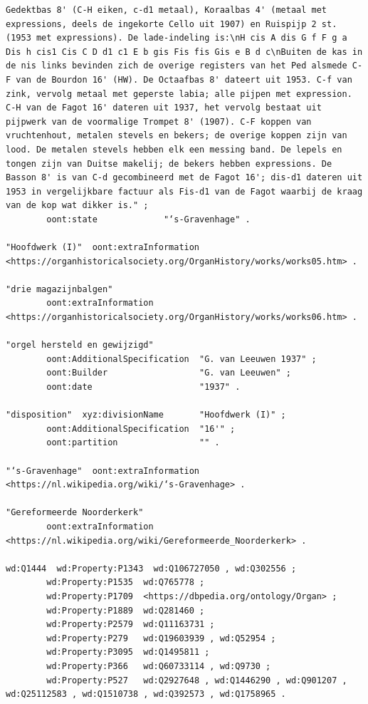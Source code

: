 \begin{lstlisting}[caption={Part14\_000GravenhageNoorderkerk}]
Gedektbas 8' (C-H eiken, c-d1 metaal), Koraalbas 4' (metaal met expressions, deels de ingekorte Cello uit 1907) en Ruispijp 2 st. (1953 met expressions). De lade-indeling is:\nH cis A dis G f F g a Dis h cis1 Cis C D d1 c1 E b gis Fis fis Gis e B d c\nBuiten de kas in de nis links bevinden zich de overige registers van het Ped alsmede C-F van de Bourdon 16' (HW). De Octaafbas 8' dateert uit 1953. C-f van zink, vervolg metaal met geperste labia; alle pijpen met expression. C-H van de Fagot 16' dateren uit 1937, het vervolg bestaat uit pijpwerk van de voormalige Trompet 8' (1907). C-F koppen van vruchtenhout, metalen stevels en bekers; de overige koppen zijn van lood. De metalen stevels hebben elk een messing band. De lepels en tongen zijn van Duitse makelij; de bekers hebben expressions. De Basson 8' is van C-d gecombineerd met de Fagot 16'; dis-d1 dateren uit 1953 in vergelijkbare factuur als Fis-d1 van de Fagot waarbij de kraag van de kop wat dikker is." ;
        oont:state             "‘s-Gravenhage" .

"Hoofdwerk (I)"  oont:extraInformation  <https://organhistoricalsociety.org/OrganHistory/works/works05.htm> .

"drie magazijnbalgen"
        oont:extraInformation  <https://organhistoricalsociety.org/OrganHistory/works/works06.htm> .

"orgel hersteld en gewijzigd"
        oont:AdditionalSpecification  "G. van Leeuwen 1937" ;
        oont:Builder                  "G. van Leeuwen" ;
        oont:date                     "1937" .

"disposition"  xyz:divisionName       "Hoofdwerk (I)" ;
        oont:AdditionalSpecification  "16'" ;
        oont:partition                "" .

"‘s-Gravenhage"  oont:extraInformation  <https://nl.wikipedia.org/wiki/‘s-Gravenhage> .

"Gereformeerde Noorderkerk"
        oont:extraInformation  <https://nl.wikipedia.org/wiki/Gereformeerde_Noorderkerk> .

wd:Q1444  wd:Property:P1343  wd:Q106727050 , wd:Q302556 ;
        wd:Property:P1535  wd:Q765778 ;
        wd:Property:P1709  <https://dbpedia.org/ontology/Organ> ;
        wd:Property:P1889  wd:Q281460 ;
        wd:Property:P2579  wd:Q11163731 ;
        wd:Property:P279   wd:Q19603939 , wd:Q52954 ;
        wd:Property:P3095  wd:Q1495811 ;
        wd:Property:P366   wd:Q60733114 , wd:Q9730 ;
        wd:Property:P527   wd:Q2927648 , wd:Q1446290 , wd:Q901207 , wd:Q25112583 , wd:Q1510738 , wd:Q392573 , wd:Q1758965 .
\end{lstlisting}

